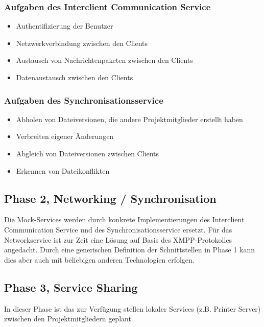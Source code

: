 \subsubsection{Aufgaben des Interclient Communication Service}
\begin{itemize}
\item Authentifizierung der Benutzer
\item Netzwerkverbindung zwischen den Clients
\item Austausch von Nachrichtenpaketen zwischen den Clients
\item Datenaustausch zwischen den Clients
\end{itemize}
\subsubsection{Aufgaben des Synchronisationsservice}
\begin{itemize}
\item Abholen von Dateiversionen, die andere Projektmitglieder erstellt haben
\item Verbreiten eigener Änderungen
\item Abgleich von Dateiversionen zwischen Clients
\item Erkennen von Dateikonflikten
\end{itemize}
\subsection{Phase 2, Networking / Synchronisation}
Die Mock-Services werden durch konkrete Implementierungen des Interclient Communication Service und des Synchronisationsservice ersetzt. Für das Networkservice ist zur Zeit eine Lösung auf Basis des XMPP-Protokolles angedacht. Durch eine generischen Definition der Schnittstellen in Phase 1 kann dies aber auch mit beliebigen anderen Technologien erfolgen.
\subsection{Phase 3, Service Sharing}
In dieser Phase ist das zur Verfügung stellen lokaler Services (z.B. Printer Server) zwischen den Projektmitgliedern geplant.



